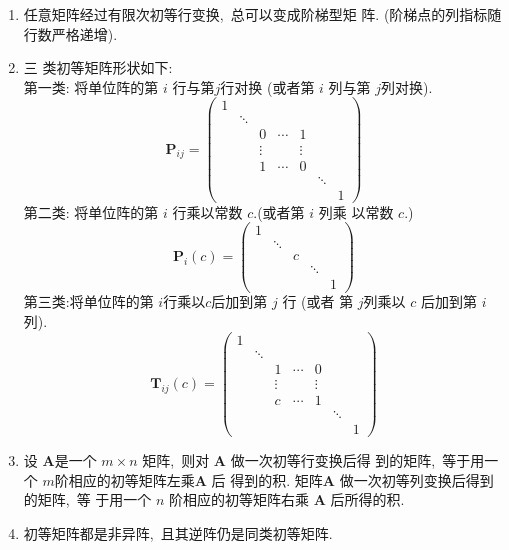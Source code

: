 \begin{enumerate}
		\item  任意矩阵经过有限次初等行变换,\  总可以变成阶梯型矩 阵. (阶梯点的列指标随行数严格递增).
		\item 三 类初等矩阵形状如下:\\
		第一类: 将单位阵的第 $ i$  行与第$  j  $行对换 (或者第  $i $ 列与第 $ j  $列对换).
		$$\boldsymbol{P}_{i j}=\left(\begin{array}{ccccccc}
			1 & & & & & & \\
			& \ddots & & & & & \\
			& & 0 & \cdots & 1 & & \\
			& & \vdots & & \vdots & & \\
			& & 1 & \cdots & 0 & & \\
			& & & & & \ddots & \\
			& & & & & & 1
		\end{array}\right)$$
		第二类: 将单位阵的第  $i $ 行乘以常数 $ c . $(或者第  $i $ 列乘 以常数 $c.$)
		$$\boldsymbol{P}_{i}(c)=\left(\begin{array}{ccccc}
			1 & & & & \\
			& \ddots & & & \\
			& & c & & \\
			& & & \ddots & \\
			& & & & 1
		\end{array}\right)$$
		第三类:将单位阵的第 $ i  $行乘以$  c  $后加到第 $ j$  行 (或者 第  $j  $列乘以  $c $ 后加到第  $i $ 列).
		$$\boldsymbol{T}_{i j}(c)=\left(\begin{array}{cccccccc}
			1 & & & & & & \\
			& \ddots & & & & & \\
			& & 1 & \cdots & 0 & & \\
			& & \vdots & & \vdots & & \\
			& & c & \cdots & 1 & & \\
			& & & & & \ddots & \\
			& & & & & & 1
		\end{array}\right)$$
		
		\item 设  $\boldsymbol{A}  $是一个 $ m \times n $ 矩阵,\  则对  $\boldsymbol{A}$  做一次初等行变换后得 到的矩阵,\  等于用一个  $m  $阶相应的初等矩阵左乘$ \boldsymbol{A} $ 后 得到的积. 矩阵$  \boldsymbol{A} $ 做一次初等列变换后得到的矩阵,\  等 于用一个 $ n $ 阶相应的初等矩阵右乘  $\boldsymbol{A}$  后所得的积.
		\item 初等矩阵都是非异阵,\  且其逆阵仍是同类初等矩阵.
		

\end{enumerate}
